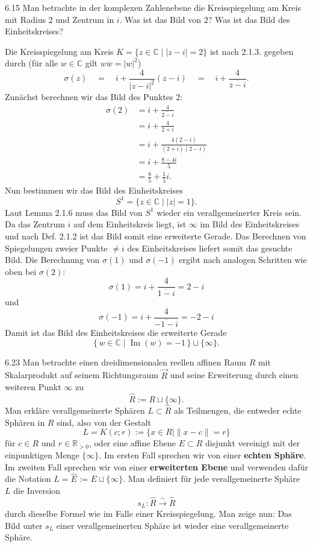 \begin{exercise}{6.1}{5}
    Man betrachte in der komplexen Zahlenebene die Kreisspiegelung am
    Kreis mit Radius $2$ und Zentrum in $i$. Was ist das Bild von $2$? Was ist das Bild des
    Einheitskreises?
\end{exercise}

Die Kreisspiegelung am Kreis $K=\{z\in\mathbb C\mid |z-i|=2\}$
ist nach 2.1.3. gegeben durch (für alle $w \in \mathbb C$ gilt $w\overline w=|w|^2$)
\[
    \sigma(z) \quad = \quad i+\frac{4}{|z-i|^2}(z-i) \quad = \quad i+\frac{4}{\overline{z-i}}.
\]
Zunächst berechnen wir das Bild des Punktes $2$:
\begin{align*}
\sigma(2)
&=
i+\frac{4}{\overline{2-i}}\\
&=
i+\frac{4}{2+i}\\
&=
i+\frac{4(2-i)}{(2+i)(2-i)}\\
&=
i+\frac{8-4i}{5}\\
&=\boxed{\frac85+\frac15 i.}
\end{align*}
Nun bestimmen wir das Bild des Einheitskreises
\[
S^1=\{z\in\mathbb C\mid |z|=1\}.
\]
Laut Lemma 2.1.6 muss das Bild von $S^1$ wieder ein verallgemeinerter Kreis sein.
Da das Zentrum $i$ auf dem Einheitskreis liegt, ist $\infty$ im Bild des Einheitskreises und nach Def. 2.1.2 ist das Bild somit eine erweiterte Gerade.
Das Berechnen von Spiegelungen zweier Punkte $\neq i$ des Einheitskreises liefert somit das gesuchte Bild.
Die Berechnung von $\sigma(1)$ und $\sigma(-1)$ ergibt nach analogen Schritten wie oben bei $\sigma(2)$:
\[
\sigma(1)=i+\frac{4}{\overline{1-i}}=2-i
\]
und
\[
\sigma(-1)=i+\frac{4}{\overline{-1-i}}=-2-i
\]
Damit ist das Bild des Einheitskreises die erweiterte Gerade
\[
\boxed{\{\,w\in\mathbb C\mid \operatorname{Im}(w)=-1\,\} 
\sqcup \{\infty\}.}
\]

\begin{exercise}{6.2}{3}
    Man betrachte einen dreidimensionalen reellen affinen Raum $R$ mit
    Skalarprodukt auf seinem Richtungsraum $\vec{R}$ und seine Erweiterung durch einen
    weiteren Punkt $\infty$ zu
    \[
    \widehat{R} := R \sqcup \{\infty\}.
    \]
    Man erkläre verallgemeinerte Sphären $L \subset \widehat{R}$ als Teilmengen, die entweder echte
    Sphären in $R$ sind, also von der Gestalt
    \[
    L = K(c;r) := \{x \in R \mid \|x-c\| = r\}
    \]
    für $c \in R$ und $r \in \mathbb{R}_{>0}$, oder eine affine Ebene $E \subset R$ disjunkt vereinigt mit der
    einpunktigen Menge $\{\infty\}$. Im ersten Fall sprechen wir von einer \textbf{echten Sphäre}.
    Im zweiten Fall sprechen wir von einer \textbf{erweiterten Ebene} und verwenden dafür
    die Notation $L = \widehat{E} := E \sqcup \{\infty\}$. Man definiert für jede verallgemeinerte Sphäre
    $L$ die Inversion
    \[
    s_L \colon \widehat{R} \xrightarrow{\sim} \widehat{R}
    \]
    durch dieselbe Formel wie im Falle einer Kreisspiegelung. Man zeige nun: Das Bild
    unter $s_L$ einer verallgemeinerten Sphäre ist wieder eine verallgemeinerte Sphäre.
\end{exercise}

